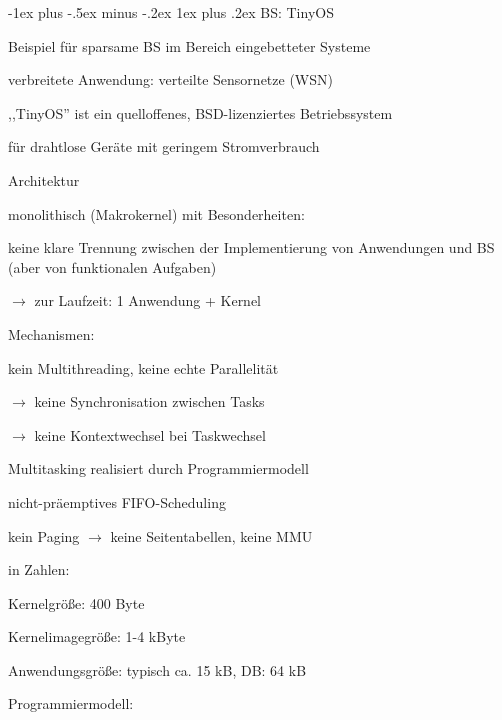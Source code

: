 \documentclass[a4paper]{article}
\makeatletter
\renewcommand{\subsubsection}{\@startsection{subsubsection}{3}{0mm}%
 {-1ex plus -.5ex minus -.2ex}%
 {1ex plus .2ex}%
 {\normalfont\small\bfseries}}
\makeatother
\begin{document}
\begin{multicols}{3}
    \subsubsection{BS: TinyOS}
    \begin{itemize*}
        \item Beispiel für sparsame BS im Bereich eingebetteter Systeme
        \item verbreitete Anwendung: verteilte Sensornetze (WSN)
        \item ,,TinyOS'' ist ein quelloffenes, BSD-lizenziertes Betriebssystem
        \item für drahtlose Geräte mit geringem Stromverbrauch
        \item Architektur
        \begin{itemize*}
            \item monolithisch (Makrokernel) mit Besonderheiten:
            \item keine klare Trennung zwischen der Implementierung von Anwendungen und BS (aber von funktionalen Aufgaben)
            \item[$\rightarrow$] zur Laufzeit: 1 Anwendung + Kernel
        \end{itemize*}
        \item Mechanismen:
        \begin{itemize*}
            \item kein Multithreading, keine echte Parallelität
            \item[$\rightarrow$] keine Synchronisation zwischen Tasks
            \item[$\rightarrow$] keine Kontextwechsel bei Taskwechsel
            \item Multitasking realisiert durch Programmiermodell
            \item nicht-präemptives FIFO-Scheduling
            \item kein Paging $\rightarrow$ keine Seitentabellen, keine MMU
        \end{itemize*}
        \item in Zahlen:
        \begin{itemize*}
            \item Kernelgröße: 400 Byte
            \item Kernelimagegröße: 1-4 kByte
            \item Anwendungsgröße: typisch ca. 15 kB, DB: 64 kB
        \end{itemize*}
        \item Programmiermodell:

\end{itemize*}
\end{multicols}
\end{document}
